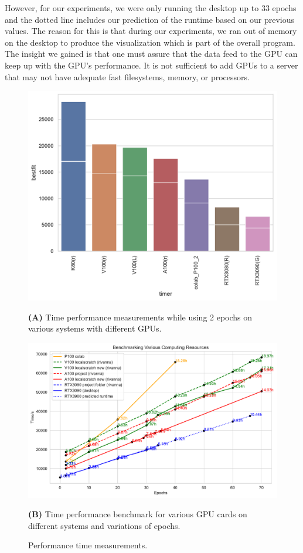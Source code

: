\documentclass[utf8]{FrontiersinVancouver} %
\begin{document}
However, for our experiments, we were only running the desktop up to 33 epochs and the dotted line includes our prediction of the runtime based on our previous values. The reason for this is that during our experiments, we ran out of memory on the desktop to produce the visualization which is part of the overall program. The insight we gained is that one must assure that the data feed to the GPU can keep up with the GPU's performance. It is not sufficient to add GPUs to a server that may not have adequate fast filesystems, memory, or processors.

\begin{figure}[p]

  \centering\includegraphics[width=0.75\columnwidth]{images/Graphics_Cards_BestFit_bar}

  {\bf (A)} Time performance measurements while using 2 epochs on
  various systems with different GPUs.

  \bigskip

  \centering\includegraphics[width=0.9\columnwidth]{images/Benchmark_comp_resource_new}

  {\bf (B)} Time performance benchmark for various GPU cards on
  different systems and variations of epochs.
    
  \caption{Performance time measurements.}
  \label{fig:performance-projection}
\end{figure}
\end{document}
